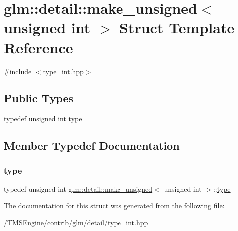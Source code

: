 \hypertarget{structglm_1_1detail_1_1make__unsigned_3_01unsigned_01int_01_4}{}\section{glm\+:\+:detail\+:\+:make\+\_\+unsigned$<$ unsigned int $>$ Struct Template Reference}
\label{structglm_1_1detail_1_1make__unsigned_3_01unsigned_01int_01_4}


{\ttfamily \#include $<$type\+\_\+int.\+hpp$>$}

\subsection*{Public Types}
\begin{DoxyCompactItemize}
\item 
typedef unsigned int \hyperlink{structglm_1_1detail_1_1make__unsigned_3_01unsigned_01int_01_4_aea3e796456b317dd2247889d3fbb9d68}{type}
\end{DoxyCompactItemize}


\subsection{Member Typedef Documentation}
\mbox{\label{structglm_1_1detail_1_1make__unsigned_3_01unsigned_01int_01_4_aea3e796456b317dd2247889d3fbb9d68}} 
\subsubsection{\texorpdfstring{type}{type}}
{\footnotesize\ttfamily typedef unsigned int \hyperlink{structglm_1_1detail_1_1make__unsigned}{glm\+::detail\+::make\+\_\+unsigned}$<$ unsigned int $>$\+::\hyperlink{structglm_1_1detail_1_1make__unsigned_3_01unsigned_01int_01_4_aea3e796456b317dd2247889d3fbb9d68}{type}}



The documentation for this struct was generated from the following file\+:\begin{DoxyCompactItemize}
\item 
/\+T\+M\+S\+Engine/contrib/glm/detail/\hyperlink{type__int_8hpp}{type\+\_\+int.\+hpp}\end{DoxyCompactItemize}
